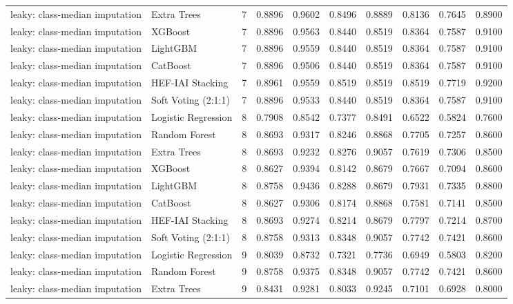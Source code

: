 \begin{tabular}{llrrrrrrrr}
leaky: class-median imputation & Extra Trees & 7 & 0.8896 & 0.9602 & 0.8496 & 0.8889 & 0.8136 & 0.7645 & 0.8900 \\
leaky: class-median imputation & XGBoost & 7 & 0.8896 & 0.9563 & 0.8440 & 0.8519 & 0.8364 & 0.7587 & 0.9100 \\
leaky: class-median imputation & LightGBM & 7 & 0.8896 & 0.9559 & 0.8440 & 0.8519 & 0.8364 & 0.7587 & 0.9100 \\
leaky: class-median imputation & CatBoost & 7 & 0.8896 & 0.9506 & 0.8440 & 0.8519 & 0.8364 & 0.7587 & 0.9100 \\
leaky: class-median imputation & HEF-IAI Stacking & 7 & 0.8961 & 0.9559 & 0.8519 & 0.8519 & 0.8519 & 0.7719 & 0.9200 \\
leaky: class-median imputation & Soft Voting (2:1:1) & 7 & 0.8896 & 0.9533 & 0.8440 & 0.8519 & 0.8364 & 0.7587 & 0.9100 \\
leaky: class-median imputation & Logistic Regression & 8 & 0.7908 & 0.8542 & 0.7377 & 0.8491 & 0.6522 & 0.5824 & 0.7600 \\
leaky: class-median imputation & Random Forest & 8 & 0.8693 & 0.9317 & 0.8246 & 0.8868 & 0.7705 & 0.7257 & 0.8600 \\
leaky: class-median imputation & Extra Trees & 8 & 0.8693 & 0.9232 & 0.8276 & 0.9057 & 0.7619 & 0.7306 & 0.8500 \\
leaky: class-median imputation & XGBoost & 8 & 0.8627 & 0.9394 & 0.8142 & 0.8679 & 0.7667 & 0.7094 & 0.8600 \\
leaky: class-median imputation & LightGBM & 8 & 0.8758 & 0.9436 & 0.8288 & 0.8679 & 0.7931 & 0.7335 & 0.8800 \\
leaky: class-median imputation & CatBoost & 8 & 0.8627 & 0.9306 & 0.8174 & 0.8868 & 0.7581 & 0.7141 & 0.8500 \\
leaky: class-median imputation & HEF-IAI Stacking & 8 & 0.8693 & 0.9274 & 0.8214 & 0.8679 & 0.7797 & 0.7214 & 0.8700 \\
leaky: class-median imputation & Soft Voting (2:1:1) & 8 & 0.8758 & 0.9313 & 0.8348 & 0.9057 & 0.7742 & 0.7421 & 0.8600 \\
leaky: class-median imputation & Logistic Regression & 9 & 0.8039 & 0.8732 & 0.7321 & 0.7736 & 0.6949 & 0.5803 & 0.8200 \\
leaky: class-median imputation & Random Forest & 9 & 0.8758 & 0.9375 & 0.8348 & 0.9057 & 0.7742 & 0.7421 & 0.8600 \\
leaky: class-median imputation & Extra Trees & 9 & 0.8431 & 0.9281 & 0.8033 & 0.9245 & 0.7101 & 0.6928 & 0.8000 \\

\end{tabular}
